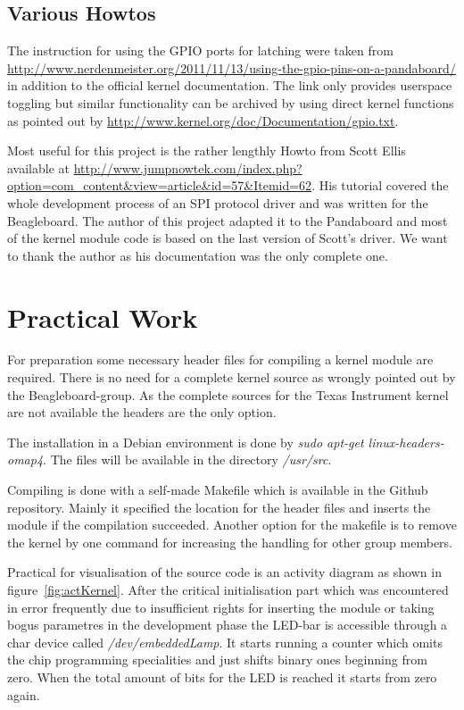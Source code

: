 \subsection{Various Howtos}

The instruction for using the GPIO ports for latching were taken from
\url{http://www.nerdenmeister.org/2011/11/13/using-the-gpio-pins-on-a-pandaboard/} in addition to the official kernel documentation.
The link only provides userspace toggling but similar functionality can be archived by using direct kernel functions as pointed out 
by \url{http://www.kernel.org/doc/Documentation/gpio.txt}.

Most useful for this project is the rather lengthly Howto from Scott Ellis available at \url{http://www.jumpnowtek.com/index.php?option=com\_content&view=article&id=57&Itemid=62}. His tutorial covered the whole development process of an SPI protocol driver and was 
written for the Beagleboard. The author of this project adapted it to the Pandaboard and most of the kernel module code is based on the last
version of Scott's driver. We want to thank the author as his documentation was the only complete one.

\section{Practical Work}

For preparation some necessary header files for compiling a kernel module are required. There is no need for a complete kernel source as 
wrongly pointed out by the Beagleboard-group. As the complete sources for the Texas Instrument kernel are not available the headers 
are the only option. 

The installation in a Debian environment is done by \textsl{sudo apt-get linux-headers-omap4}. The files will be available in the 
directory \textsl{/usr/src}.

Compiling is done with a self-made Makefile which is available in the Github repository. Mainly it specified the location for the header files
and inserts the module if the compilation succeeded. Another option for the makefile is to remove the kernel by one command for increasing 
the handling for other group members.

Practical for visualisation of the source code is an activity diagram as shown in figure~\ref{fig:actKernel}. After the critical 
initialisation part which was encountered in error frequently due to insufficient rights for inserting the module or taking bogus parametres
in the development phase the LED-bar is accessible through a char device called \textsl{/dev/embeddedLamp}. It starts running a counter 
which omits the chip programming specialities and just shifts binary ones beginning from zero. When the total amount of bits for the 
LED is reached it starts from zero again.


